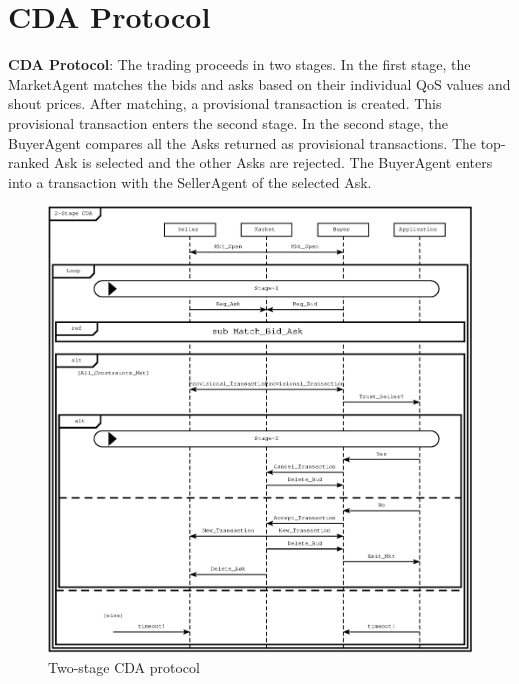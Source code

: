 \documentclass[10pt,journal,compsoc]{IEEEtran}
\begin{document}
\section{CDA Protocol}
\textbf{CDA Protocol}: The trading proceeds in two stages. In the first stage, the MarketAgent matches the bids and asks based on their individual QoS values and shout prices. After matching, a provisional transaction is created. This provisional transaction enters the second stage. In the second stage, the BuyerAgent compares all the Asks returned as provisional transactions. The top-ranked Ask is selected and the other Asks are rejected. The BuyerAgent enters into a transaction with the SellerAgent of the selected Ask.

\begin{figure}[h]
\centering
\includegraphics[scale=0.7]{Figure27.eps}
\caption{Two-stage CDA protocol \label{fig:cda_protocol}}
\end{figure}
\end{document}
